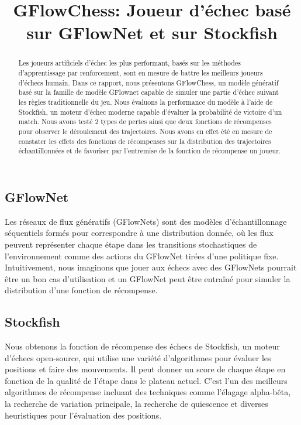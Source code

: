 \documentclass[11pt]{article}
\title{GFlowChess: Joueur d'échec basé sur GFlowNet et sur Stockfish}
\author[1]{\nameemail{Yizhan Li}{yizhan.li@umontreal.ca}}
\author[1]{\nameemail{Olivier
    Déry-Prévost}{olivier.dery-prevost@umontreal.ca}}
\author[1]{\nameemail{Sidya Galakho}{sidya.galakho@umontreal.ca}}
\author[1]{\nameemail{Simon Théorêt}{simon.theoret.1@umontreal.ca}}
\affil[1]{Université de Montréal}
\begin{document}
\maketitle


\begin{abstract}
  Les joueurs artificiels d'échec les plus performant, basés sur les
  méthodes d'apprentissage par renforcement, sont en mesure de battre
  les meilleurs joueurs d'échecs humain.  Dans ce rapport, nous
  présentons GFlowChess, un modèle génératif basé sur la famille de
  modèle GFlownet capable de simuler une partie d'échec suivant les
  règles traditionnelle du jeu. Nous évaluons la performance du modèle
  à l'aide de Stockfish, un moteur d'échec moderne capable d'évaluer
  la probabilité de victoire d'un match. Nous avons testé 2 types de
  pertes ainsi que deux fonctions de récompenses pour observer le
  déroulement des trajectoires. Nous avons en effet été en mesure de
  constater les effets des fonctions de récompenses sur la
  distribution des trajectoires échantillonnées et de favoriser par
  l'entremise de la fonction de récompense un joueur.
\end{abstract}

\subsection{GFlowNet}
Les réseaux de flux génératifs (GFlowNets) sont des modèles
d'échantillonnage séquentiels formés pour correspondre à une
distribution donnée, où les flux peuvent représenter chaque étape dans
les transitions stochastiques de l'environnement comme des actions du
GFlowNet tirées d'une politique fixe. Intuitivement, nous imaginons
que jouer aux échecs avec des GFlowNets pourrait être un bon cas
d'utilisation et un GFlowNet peut être entraîné pour simuler la
distribution d'une fonction de récompense.

\subsection{Stockfish}
Nous obtenons la fonction de récompense des échecs de Stockfish, un
moteur d'échecs open-source, qui utilise une variété d'algorithmes
pour évaluer les positions et faire des mouvements. Il peut donner un
score de chaque étape en fonction de la qualité de l'étape dans le
plateau actuel. C'est l'un des meilleurs algorithmes de récompense
incluant des techniques comme l'élagage alpha-bêta, la recherche de
variation principale, la recherche de quiescence et diverses
heuristiques pour l'évaluation des positions.
\end{document}
